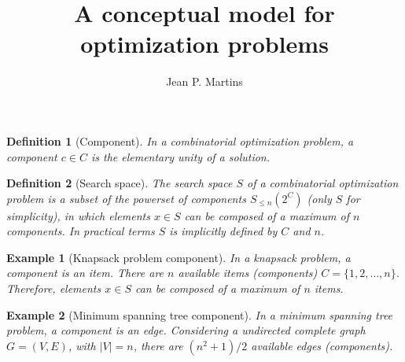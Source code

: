 \documentclass[12pt,a4paper,onecolumn]{amsart}
\author{Jean P. Martins}
\title{A conceptual model for optimization problems}
\begin{document}
\begin{abstract}

\end{abstract}

\maketitle

\newtheorem{definition}{Definition}[section]
\newtheorem{example}{Example}[section]

\begin{definition}[Component]
In a combinatorial optimization problem, a component $c\in C$ is the elementary unity of a solution. 
\end{definition}

\begin{definition}[Search space]
The search space $S$ of a combinatorial optimization problem is a subset of the powerset of components $S_{\leq n}(2^C)$ (only $S$ for simplicity), in which elements $x\in S$ can be composed of a maximum of $n$ components. In practical terms $S$ is implicitly defined by $C$ and $n$.
\end{definition}

\begin{tcolorbox}
	\begin{example}[Knapsack problem component]
	In a knapsack problem, a component is an item. There are $n$ available items (components) $C=\{1,2,\dots,n\}$. Therefore, elements $x\in S$ can be composed of a maximum of $n$ items. 
	\end{example}
	
	\begin{example}[Minimum spanning tree component]
	In a minimum spanning tree problem, a component is an edge. Considering a undirected complete graph $G=(V,E)$, with $|V|=n$, there are ${(n^2 +1)}/{2}$ available edges (components). 
	\end{example}
\end{tcolorbox}
\end{document}
